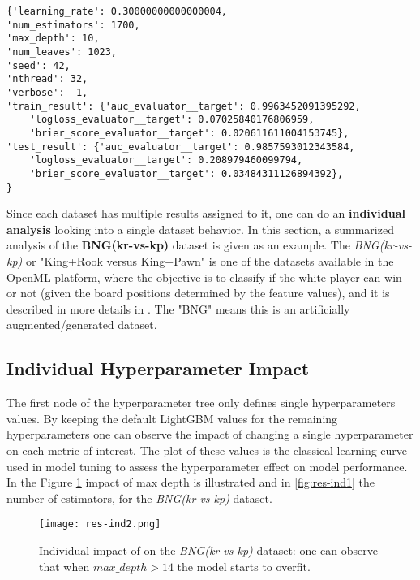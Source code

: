 \begin{lstlisting}[caption={BNG(kr-vs-kp) experiment result for hyperparam combination (0.3, 1700, 10)}, label={lst:krkp-result}]
{'learning_rate': 0.30000000000000004,
'num_estimators': 1700,
'max_depth': 10,
'num_leaves': 1023,
'seed': 42,
'nthread': 32,
'verbose': -1,
'train_result': {'auc_evaluator__target': 0.9963452091395292,
    'logloss_evaluator__target': 0.07025840176806959,
    'brier_score_evaluator__target': 0.020611611004153745},
'test_result': {'auc_evaluator__target': 0.9857593012343584,
    'logloss_evaluator__target': 0.208979460099794,
    'brier_score_evaluator__target': 0.03484311126894392},
}  \end{lstlisting}


Since each dataset has multiple results assigned to it, one can do an \textbf{individual analysis} looking into a single dataset behavior. In this section, a summarized analysis of the \textbf{BNG(kr-vs-kp)} dataset is given as an example. The \textit{BNG(kr-vs-kp)} or "King+Rook versus King+Pawn" is one of the datasets available in the OpenML platform, where the objective is to classify if the white player can win or not (given the board positions determined by the feature values), and it is described in more details in \cite{shapiro1987structured}. The "BNG" means this is an artificially augmented/generated dataset.

\subsection{Individual Hyperparameter Impact}
\label{subsec:indv-impact}

The first node of the hyperparameter tree only defines single hyperparameters values. By keeping the default LightGBM values for the remaining hyperparameters one can observe the impact of changing a single hyperparameter on each metric of interest. The plot of these values is the classical learning curve used in model tuning to assess the hyperparameter effect on model performance. In the Figure \ref{fig:res-ind2} impact of max depth is illustrated and in \ref{fig:res-ind1} the number of estimators, for the \textit{BNG(kr-vs-kp)} dataset.

\begin{figure}[!h]
    \centering
    \texttt{[image: res-ind2.png]} 
    \caption{Individual impact of \textbf{} on the \textit{BNG(kr-vs-kp)} dataset: one can observe that when $max\_depth > 14$ the model starts to overfit.}
    \label{fig:res-ind2}
\end{figure}

